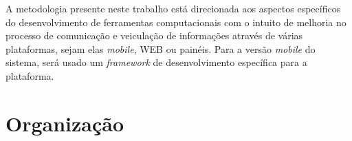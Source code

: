A metodologia presente neste trabalho está direcionada aos aspectos específicos do desenvolvimento de ferramentas computacionais com o intuito de melhoria no processo de comunicação e veiculação de informações através de várias plataformas, sejam elas \textit{mobile}, WEB ou painéis. Para a versão \textit{mobile} do sistema, será usado um \textit{framework} de desenvolvimento específica para a plataforma. 


\section{Organização}
